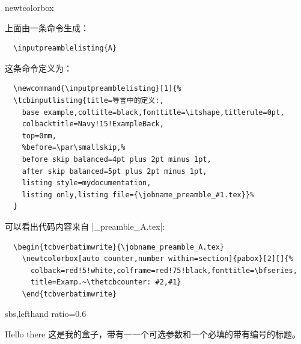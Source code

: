 \begin{docCommand}{newtcolorbox}{}


\begin{tcolorbox}[breakable, title=译者对上面这个盒子的分析]
  上面由一条命令生成：

  \begin{verbatim}
  \inputpreamblelisting{A}
  \end{verbatim}

  \tcbline  

  这条命令定义为：
  \begin{verbatim}
  \newcommand{\inputpreamblelisting}[1]{%
  \tcbinputlisting{title=导言中的定义:,
    base example,coltitle=black,fonttitle=\itshape,titlerule=0pt,
    colbacktitle=Navy!15!ExampleBack,
    top=0mm,
    %before=\par\smallskip,%
    before skip balanced=4pt plus 2pt minus 1pt,
    after skip balanced=5pt plus 2pt minus 1pt,
    listing style=mydocumentation,
    listing only,listing file={\jobname_preamble_#1.tex}}%
  }
  \end{verbatim}

  \tcbline  

  可以看出代码内容来自 |\jobname_preamble_A.tex|:
  \begin{verbatim}
  \begin{tcbverbatimwrite}{\jobname_preamble_A.tex}
    \newtcolorbox[auto counter,number within=section]{pabox}[2][]{%
      colback=red!5!white,colframe=red!75!black,fonttitle=\bfseries,
      title=Examp.~\thetcbcounter: #2,#1}
    \end{tcbverbatimwrite}
  \end{verbatim}
\end{tcolorbox}


\begin{dispExample*}{sbs,lefthand ratio=0.6}
\begin{pabox}[colback=yellow]{Hello there}
这是我的盒子，带有一一个可选参数和一个必填的带有编号的标题。
\end{pabox}
\end{dispExample*}
\end{docCommand}


